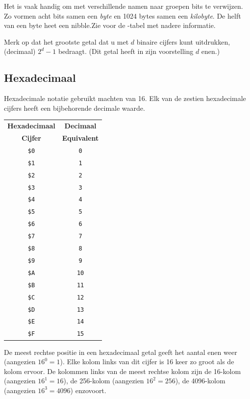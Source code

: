 Het is vaak handig om met verschillende namen naar groepen bits te verwijzen. Zo vormen acht bits samen een {\it byte} en 1024 bytes samen een {\it kilobyte}. De helft van een byte heet een nibble.Zie  voor de -tabel met nadere informatie.

Merk op dat het grootste getal dat u met $d$ binaire cijfers kunt uitdrukken, (decimaal) $2^{d} - 1$ bedraagt. (Dit getal heeft in zijn voorstelling $d$ enen.)

\subsection{Hexadecimaal}Hexadecimale notatie gebruikt machten van 16. Elk van de zestien hexadecimale cijfers heeft een bijbehorende decimale waarde.

\begin{center}
	\begin{tabular}{|c|c|}
		\hline
		{\bf Hexadecimaal} & {\bf Decimaal} \\		{\bf Cijfer} & {\bf Equivalent} \\ \hhline{|=|=|}		\texttt{\$0} & \texttt{0} \\ \hline		\texttt{\$1} & \texttt{1} \\ \hline		\texttt{\$2} & \texttt{2} \\ \hline		\texttt{\$3} & \texttt{3} \\ \hline		\texttt{\$4} & \texttt{4} \\ \hline		\texttt{\$5} & \texttt{5} \\ \hline		\texttt{\$6} & \texttt{6} \\ \hline		\texttt{\$7} & \texttt{7} \\ \hline		\texttt{\$8} & \texttt{8} \\ \hline		\texttt{\$9} & \texttt{9} \\ \hline		\texttt{\$A} & \texttt{10} \\ \hline		\texttt{\$B} & \texttt{11} \\ \hline		\texttt{\$C} & \texttt{12} \\ \hline		\texttt{\$D} & \texttt{13} \\ \hline		\texttt{\$E} & \texttt{14} \\ \hline		\texttt{\$F} & \texttt{15} \\ \hline
	\end{tabular}
\end{center}

De meest rechtse positie in een hexadecimaal getal geeft het aantal enen weer (aangezien $16^{0} = 1$). Elke kolom links van dit cijfer is 16 keer zo groot als de kolom ervoor. De kolommen links van de meest rechtse kolom zijn de 16-kolom (aangezien $16^{1} = 16$), de 256-kolom (aangezien $16^{2} = 256$), de 4096-kolom (aangezien $16^{3} = 4096$) enzovoort.

